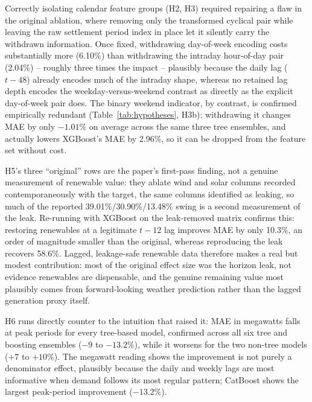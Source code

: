 \documentclass[runningheads]{llncs}
\begin{document}
Correctly isolating calendar feature groups (H2, H3) required repairing a flaw in the original ablation, where removing only the transformed cyclical pair while leaving the raw settlement period index in place let it silently carry the withdrawn information. Once fixed, withdrawing day-of-week encoding costs substantially more (6.10\%) than withdrawing the intraday hour-of-day pair (2.04\%) -- roughly three times the impact -- plausibly because the daily lag ($t-48$) already encodes much of the intraday shape, whereas no retained lag depth encodes the weekday-versus-weekend contrast as directly as the explicit day-of-week pair does. The binary weekend indicator, by contrast, is confirmed empirically redundant (Table~\ref{tab:hypotheses}, H3b): withdrawing it changes MAE by only $-1.01\%$ on average across the same three tree ensembles, and actually lowers XGBoost's MAE by 2.96\%, so it can be dropped from the feature set without cost.

H5's three ``original'' rows are the paper's first-pass finding, not a genuine measurement of renewable value: they ablate wind and solar columns recorded contemporaneously with the target, the same columns identified as leaking, so much of the reported 39.01\%/30.90\%/13.48\% swing is a second measurement of the leak. Re-running with XGBoost on the leak-removed matrix confirms this: restoring renewables at a legitimate $t-12$ lag improves MAE by only 10.3\%, an order of magnitude smaller than the original, whereas reproducing the leak recovers 58.6\%. Lagged, leakage-safe renewable data therefore makes a real but modest contribution: most of the original effect size was the horizon leak, not evidence renewables are dispensable, and the genuine remaining value most plausibly comes from forward-looking weather prediction rather than the lagged generation proxy itself.

H6 runs directly counter to the intuition that raised it: MAE in megawatts falls at peak periods for every tree-based model, confirmed across all six tree and boosting ensembles ($-9$ to $-13.2\%$), while it worsens for the two non-tree models ($+7$ to $+10\%$). The megawatt reading shows the improvement is not purely a denominator effect, plausibly because the daily and weekly lags are most informative when demand follows its most regular pattern; CatBoost shows the largest peak-period improvement ($-13.2\%$).
\end{document}

